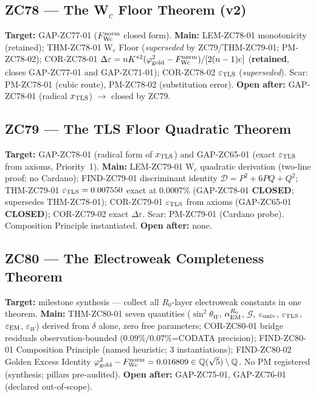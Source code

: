 \documentclass[11pt, a4paper]{article}
\begin{document}
\subsection{ZC78 --- The W$_c$ Floor Theorem (v2)}

\begin{zcbox}[title={ZC78: COR-ZC78-01 --- $\Delta\varepsilon$ Exact
  (THM-ZC78-01 Superseded)}]
\sloppy
\textbf{Target:} GAP-ZC77-01 ($F_{\rm Wc}^{\rm norm}$ closed form).
\textbf{Main:} LEM-ZC78-01 monotonicity (retained);
THM-ZC78-01 W$_c$ Floor (\textit{superseded} by ZC79/THM-ZC79-01;
PM-ZC78-02);
COR-ZC78-01 $\Delta\varepsilon=nK^{*2}(\varphi_{\rm gold}^2-F_{\rm Wc}^{\rm norm})/[2(n-1)e]$
(\textbf{retained}, closes GAP-ZC77-01 and GAP-ZC71-01);
COR-ZC78-02 $\varepsilon_{\rm TLS}$ (\textit{superseded}).
Scar: PM-ZC78-01 (cubic route), PM-ZC78-02 (substitution error).
\textbf{Open after:} GAP-ZC78-01 (radical $x_{\rm TLS}$) $\to$ closed by ZC79.
\end{zcbox}

\subsection{ZC79 --- The TLS Floor Quadratic Theorem}

\begin{zcbox}[title={ZC79: THM-ZC79-01 --- TLS Floor Quadratic (Exact)}]
\sloppy
\textbf{Target:} GAP-ZC78-01 (radical form of $x_{\rm TLS}$) and
GAP-ZC65-01 (exact $\varepsilon_{\rm TLS}$ from axioms, Priority~1).
\textbf{Main:} LEM-ZC79-01 W$_c$ quadratic derivation (two-line proof;
no Cardano); FIND-ZC79-01 discriminant identity
$\mathcal{D}=P^2+6PQ+Q^2$; THM-ZC79-01 $\varepsilon_{\rm TLS}=0.007550$
exact at $0.0007\%$ (GAP-ZC78-01 \textbf{CLOSED}; supersedes THM-ZC78-01);
COR-ZC79-01 $\varepsilon_{\rm TLS}$ from axioms
(GAP-ZC65-01 \textbf{CLOSED}); COR-ZC79-02 exact $\Delta\varepsilon$.
Scar: PM-ZC79-01 (Cardano probe). Composition Principle instantiated.
\textbf{Open after:} none.
\end{zcbox}

\subsection{ZC80 --- The Electroweak Completeness Theorem}

\begin{zcbox}[title={ZC80: THM-ZC80-01 --- Electroweak Completeness
  (Milestone, Exact)}]
\sloppy
\textbf{Target:} milestone synthesis --- collect all $R_0$-layer
electroweak constants in one theorem.
\textbf{Main:} THM-ZC80-01 seven quantities
($\sin^2\theta_W$, $\alpha_{\rm EM}^{R_0}$, $\mathcal{G}$,
$\varepsilon_{\rm univ}$, $\varepsilon_{\rm TLS}$, $\varepsilon_{\rm EM}$,
$\varepsilon_W$) derived from $\delta$ alone, zero free parameters;
COR-ZC80-01 bridge residuals observation-bounded
($0.09\%/0.07\%$=CODATA precision);
FIND-ZC80-01 Composition Principle (named heuristic; 3 instantiations);
FIND-ZC80-02 Golden Excess Identity
$\varphi_{\rm gold}^2-F_{\rm Wc}^{\rm norm}=0.016809
\in\mathbb{Q}(\sqrt{5})\setminus\mathbb{Q}$.
No PM registered (synthesis; pillars pre-audited).
\textbf{Open after:} GAP-ZC75-01, GAP-ZC76-01 (declared out-of-scope).
\end{zcbox}
\end{document}
